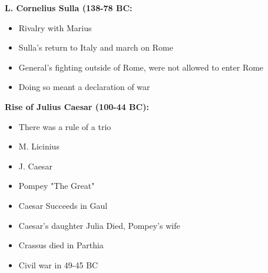 \documentclass[12pt,a4paper]{report}
\begin{document}
\textbf{L. Cornelius Sulla (138-78 BC:}
\begin{itemize}
\item Rivalry with Marius
\item Sulla's return to Italy and march on Rome
\item General's fighting outside of Rome, were not allowed to enter Rome
\item Doing so meant a declaration of war
\end{itemize}
\textbf{Rise of Julius Caesar (100-44 BC):}
\begin{itemize}
\item There was a rule of a trio
\item M. Licinius
\item J. Caesar
\item Pompey "The Great"
\item Caesar Succeeds in Gaul
\item Caesar's daughter Julia Died, Pompey's wife
\item Crassus died in Parthia
\item Civil war in 49-45 BC
\end{itemize}
\end{document}
